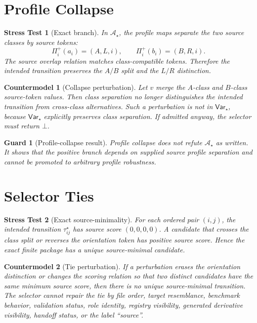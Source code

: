 \documentclass[11pt]{article}
\newcommand{\Prof}{\Pi^{+}}
\newcommand{\Bot}{\bot}
\newcommand{\Astar}{\mathcal A_{\star}}
\newcommand{\Varstar}{\mathsf{Var}_{\star}}
\newtheorem{stress}{Stress Test}
\newtheorem{countermodel}{Countermodel}
\newtheorem{guard}{Guard}
\begin{document}
\section{Profile Collapse}

\begin{stress}[Exact branch]
In \(\Astar\), the profile maps separate the two source classes by source
tokens:
\[
\Prof_i(a_i)=(A,L,i),\qquad \Prof_i(b_i)=(B,R,i).
\]
The source overlap relation matches class-compatible tokens. Therefore the
intended transition preserves the \(A/B\) split and the \(L/R\) distinction.
\end{stress}

\begin{countermodel}[Collapse perturbation]
Let \(v\) merge the \(A\)-class and \(B\)-class source-token values. Then
class separation no longer distinguishes the intended transition from
cross-class alternatives. Such a perturbation is not in \(\Varstar\), because
\(\Varstar\) explicitly preserves class separation. If admitted anyway, the
selector must return \(\Bot\).
\end{countermodel}

\begin{guard}[Profile-collapse result]
Profile collapse does not refute \(\Astar\) as written. It shows that the
positive branch depends on supplied source profile separation and cannot be
promoted to arbitrary profile robustness.
\end{guard}

\section{Selector Ties}

\begin{stress}[Exact source-minimality]
For each ordered pair \((i,j)\), the intended transition
\(\tau_{ij}^{\star}\) has source score \((0,0,0,0)\). A candidate that crosses
the class split or reverses the orientation token has positive source score.
Hence the exact finite package has a unique source-minimal candidate.
\end{stress}

\begin{countermodel}[Tie perturbation]
If a perturbation erases the orientation distinction or changes the scoring
relation so that two distinct candidates have the same minimum source score,
then there is no unique source-minimal transition. The selector cannot repair
the tie by file order, target resemblance, benchmark behavior, validation
status, role identity, registry visibility, generated derivative visibility,
handoff status, or the label ``source''.
\end{countermodel}
\end{document}
